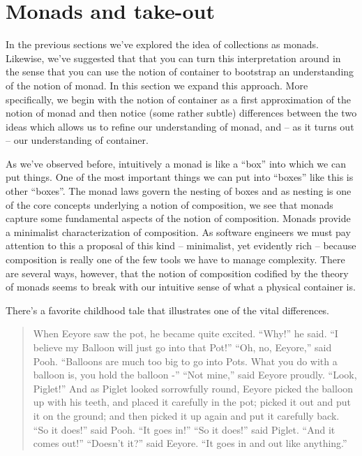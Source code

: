 \section{Monads and take-out}

In the previous sections we've explored the idea of collections as
monads. Likewise, we've suggested that that you can turn this
interpretation around in the sense that you can use the notion of
container to bootstrap an understanding of the notion of monad. In
this section we expand this approach. More specifically, we begin with
the notion of container as a first approximation of the notion of
monad and then notice (some rather subtle) differences between the two
ideas which allows us to refine our understanding of monad, and -- as
it turns out -- our understanding of container.

As we've observed before, intuitively a monad is like a ``box'' into
which we can put things. One of the most important things we can put
into ``boxes'' like this is other ``boxes''. The monad laws govern the
nesting of boxes and as nesting is one of the core concepts underlying
a notion of composition, we see that monads capture some fundamental
aspects of the notion of composition. Monads provide a minimalist
characterization of composition. As software engineers we must pay
attention to this a proposal of this kind -- minimalist, yet evidently
rich -- because composition is really one of the few tools we have to
manage complexity. There are several ways, however, that the notion of
composition codified by the theory of monads seems to break with our
intuitive sense of what a physical container is.

There's a favorite childhood tale that illustrates one of the vital
differences. 

\begin{quotation}
  When Eeyore saw the pot, he became quite excited.
  “Why!” he said. “I believe my Balloon will just go into that Pot!”
  “Oh, no, Eeyore,” said Pooh. “Balloons are much too big to go into Pots. What you do with a balloon is, you hold the balloon -”
  “Not mine,” said Eeyore proudly. “Look, Piglet!”
  And as Piglet looked sorrowfully round, Eeyore picked the balloon up with his teeth, and placed it carefully in the pot; picked it out and put it on the ground; and then picked it up again and put it carefully back.
  “So it does!” said Pooh. “It goes in!”
  “So it does!” said Piglet. “And it comes out!”
  “Doesn’t it?” said Eeyore. “It goes in and out like anything.”
\end{quotation}

